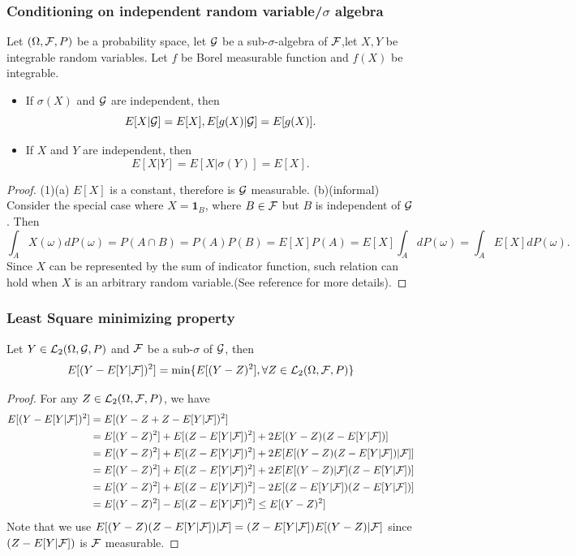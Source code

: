 \begin{refsection}
\subsubsection{Conditioning on independent random variable/$\sigma$ algebra}
\begin{lemma}\cite[70]{shreve2004stochastic2}Let $(\Omega,\mathcal{F},P)$ be a probability space, let $\mathcal{G}$ be a sub-$\sigma$-algebra of $\mathcal{F}$,let $X,Y$ be integrable random variables. Let $f$ be Borel measurable function and $f(X)$ be integrable.
\begin{itemize}
	\item If $\sigma(X)$ and $\mathcal{G}$ are independent, then
$$E[X|\mathcal{G}] = E[X], E[g(X)|\mathcal{G}] = E[g(X)].$$
	\item If $X$ and $Y$ are independent, then
$$E[X|Y] = E[X|\sigma(Y)] = E[X].$$
\end{itemize} 	
\end{lemma}
\begin{proof}
(1)(a) $E[X]$ is a constant, therefore is $\mathcal{G}$ measurable. (b)(informal)	Consider the special case where $X = \bm{1}_B$, where $B\in \mathcal{F}$ but $B$ is independent of $\mathcal{G}$. Then
$$\int_A X(\omega)dP(\omega) = P(A\cap B) = P(A)P(B) = E[X]P(A) = E[X]\int_A dP(\omega) = \int_A E[X] dP(\omega).$$
Since $X$ can be represented by the sum of indicator function, such relation can hold when $X$ is an arbitrary random variable.(See reference for more details).
\end{proof}

\subsubsection{Least Square minimizing property}
\begin{lemma}\label{ch:theory-of-probability:th:leastSquareMinimizingConditionalExpectation}
	Let $Y\in \mathcal{L}_2(\Omega,\mathcal{G},P)$ and $\mathcal{F}$ be a sub-$\sigma$ of $\mathcal{G}$, then
	$$E[(Y - E[Y|\mathcal{F}])^2] = \min\{E[(Y-Z)^2], \forall Z\in \mathcal{L}_2(\Omega,\mathcal{F},P) \}$$
\end{lemma}
\begin{proof}
	For any $Z\in \mathcal{L}_2(\Omega,\mathcal{F},P)$, we have
	\begin{align*}
	E[(Y - E[Y|\mathcal{F}])^2] &= E[(Y - Z + Z - E[Y|\mathcal{F}])^2] \\
	&=E[(Y-Z)^2] + E[(Z - E[Y|\mathcal{F}])^2] + 2E[(Y-Z)(Z-E[Y|\mathcal{F}])] \\
	&=E[(Y-Z)^2] + E[(Z - E[Y|\mathcal{F}])^2] + 2E[E[(Y-Z)(Z-E[Y|\mathcal{F}])|\mathcal{F}]] \\
	&=E[(Y-Z)^2] + E[(Z - E[Y|\mathcal{F}])^2] + 2E[E[(Y-Z)|\mathcal{F}](Z-E[Y|\mathcal{F}])] \\
	&=E[(Y-Z)^2] + E[(Z - E[Y|\mathcal{F}])^2] - 2E[(Z-E[Y|\mathcal{F}])(Z-E[Y|\mathcal{F}])] \\
	&=E[(Y-Z)^2] - E[(Z - E[Y|\mathcal{F}])^2] \leq E[(Y-Z)^2] 
	\end{align*} 	
	Note that we use $E[(Y-Z)(Z-E[Y|\mathcal{F}])|\mathcal{F}]= (Z-E[Y|\mathcal{F}])E[(Y-Z)|\mathcal{F}]$ since $(Z - E[Y|\mathcal{F}])$ is $\mathcal{F}$ measurable.
\end{proof}



\end{refsection}
